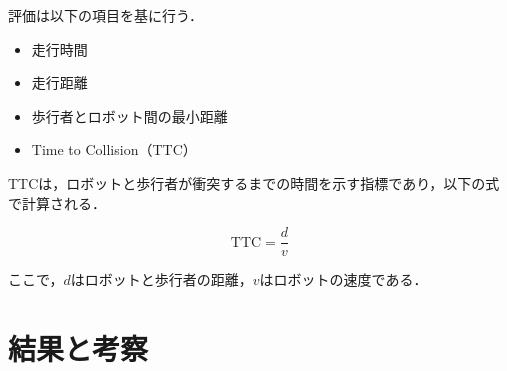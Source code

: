 \newpage

評価は以下の項目を基に行う．
\begin{itemize}
  \item 走行時間
  \item 走行距離
  \item 歩行者とロボット間の最小距離
  \item Time to Collision（TTC）
\end{itemize}

TTCは，ロボットと歩行者が衝突するまでの時間を示す指標であり，以下の式で計算される．

\begin{equation}
  \text{TTC} = \frac{d}{v}
\end{equation}

ここで，$d$はロボットと歩行者の距離，$v$はロボットの速度である．

\section{結果と考察}

\newpage
